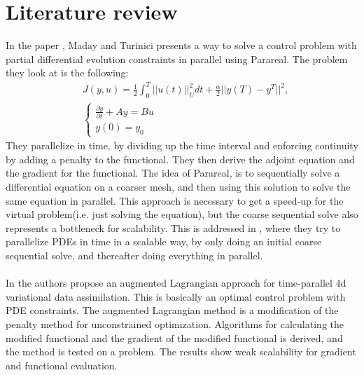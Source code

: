 \chapter{Literature review}
In the paper \cite{maday2002parareal}, Maday and Turinici presents a way to solve a control problem with partial differential evolution constraints in parallel using Parareal. The problem they look at is the following:
\begin{align*}
&J(y,u) = \frac{1}{2}\int_0^T||u(t)||_U^2dt + \frac{\alpha}{2}||y(T)-y^T||^2,\\
&\left\{
     \begin{array}{lr}
       	\frac{\partial y}{\partial t}+Ay = Bu\\
       	   y(0)=y_0
     \end{array}
   \right.
\end{align*}
They parallelize in time, by dividing up the time interval and enforcing continuity by adding a penalty to the functional. They then derive the adjoint equation and the gradient for the functional. The idea of Parareal, is to sequentially solve a differential equation on a coarser mesh, and then using this solution to solve the same equation in parallel. This approach is necessary to get a speed-up for the virtual problem(i.e. just solving the equation), but the coarse sequential solve also represents a bottleneck for scalability. This is addressed in \cite{rao2014adjoint}, where they try to parallelize PDEs in time in a scalable way, by only doing an initial coarse sequential solve, and thereafter doing everything in parallel.  
\\
\\
In \cite{rao2016time} the authors propose an augmented Lagrangian approach for time-parallel 4d variational data assimilation. This is basically an optimal control problem with PDE constraints. The augmented Lagrangian method is a modification of the penalty method for unconstrained optimization. Algorithms for calculating the modified functional and the gradient of the modified functional is derived, and the method is tested on a problem. The results show weak scalability for gradient and functional evaluation. 